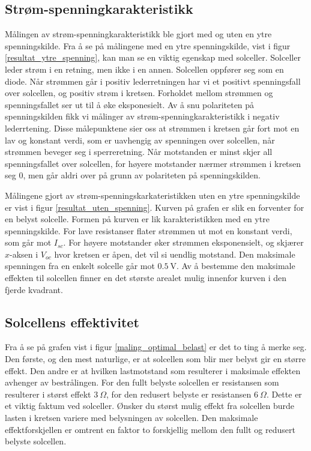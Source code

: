 \documentclass[%
 reprint,
 amsmath,amssymb,
 aps,
 norsk,
 booktabs
]{revtex4-1}
\begin{document}
\subsection{Strøm-spenningkarakteristikk}
Målingen av strøm-spenningkarakteristikk ble gjort med og uten en ytre spenningskilde. Fra å se på målingene med en ytre spenningskilde, vist i figur \vref{resultat_ytre_spenning}, kan man se en viktig egenskap med solceller. Solceller leder strøm i en retning, men ikke i en annen. Solcellen oppfører seg som en diode. Når strømmen går i positiv lederretningen har vi et positivt spenningsfall over solcellen, og positiv strøm i kretsen. Forholdet mellom strømmen og spenningsfallet ser ut til å øke eksponesielt. Av å snu polariteten på spenningskilden fikk vi målinger av strøm-spenningkarakteristikk i negativ lederrtening. Disse målepunktene sier oss at strømmen i kretsen går fort mot en lav og konstant verdi, som er uavhengig av spenningen over solcellen, når strømmen beveger seg i sperreretning. Når motstanden er minst skjer all spenningsfallet over solcellen, for høyere motstander nærmer strømmen i kretsen seg $0$, men går aldri over på grunn av polariteten på spenningskilden.\par
Målingene gjort av strøm-spenningskarkateristikken uten en ytre spenningskilde er vist i figur \vref{resultat_uten_spenning}. Kurven på grafen er slik en forventer for en belyst solcelle. Formen på kurven er lik karakteristikken med en ytre spenningskilde. For lave resistanser flater strømmen ut mot en konstant verdi, som går mot $I_{sc}$. For høyere motstander øker strømmen eksponensielt, og skjærer $x$-aksen i $V_{oc}$ hvor kretsen er åpen, det vil si uendlig motstand. Den maksimale spenningen fra en enkelt solcelle går mot $\SI{0.5}{\volt}$. Av å bestemme den maksimale effekten til solcellen finner en det største arealet mulig innenfor kurven i den fjerde kvadrant.
\subsection{Solcellens effektivitet}
Fra å se på grafen vist i figur \vref{maling_optimal_belast} er det to ting å merke seg. Den første, og den mest naturlige, er at solcellen som blir mer belyst gir en større effekt. Den andre er at hvilken lastmotstand som resulterer i maksimale effekten avhenger av bestrålingen. For den fullt belyste solcellen er resistansen som resulterer i størst effekt $\SI{3}{\Omega}$, for den redusert belyste er resistansen $\SI{6}{\Omega}$. Dette er et viktig faktum ved solceller. Ønsker du størst mulig effekt fra solcellen burde lasten i kretsen variere med belysningen av solcellen. Den maksimale effektforskjellen er omtrent en faktor to forskjellig mellom den fullt og redusert belyste solcellen.
\end{document}
